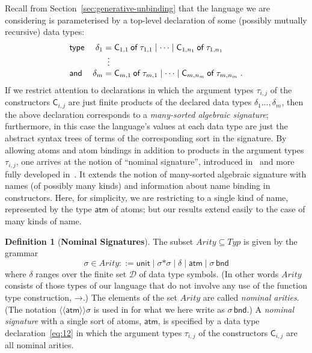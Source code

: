\documentclass{LMCS}
\theoremstyle{plain}
\theoremstyle{definition}
\newtheorem{definition}[thm]{Definition}
\newcommand{\ALT}{\mathrel{\kw{|}}}
\newcommand{\AND}{\kw{and}}
\newcommand{\ar}[1][\sigma]{#1}
\newcommand{\Arity}{\mathit{Arity}}
\newcommand{\ATM}{\kw{atm}}
\newcommand{\BINDTY}{\kw{bnd}}
\newcommand{\CON}[1][C]{\kw{#1}}
\newcommand{\dty}{\delta}
\newcommand{\Dty}{\mathcal{D}}
\newcommand{\EQ}{\mathbin{\kw{=}}}
\newcommand{\FUNTY}{\mathbin{\rightarrow}}
\newcommand{\kw}[1]{\mathsf{#1}}
\newcommand{\OF}{\mathbin{\kw{of}}}
\newcommand{\PRODTY}{\mathbin{\kw{*}}}
\newcommand{\ty}{\tau}
\newcommand{\Ty}{\mathit{Typ}}
\newcommand{\TYPE}{\kw{type}}
\newcommand{\UNIT}{\kw{unit}}
\begin{document}
Recall from Section~\ref{sec:generative-unbinding} that the language
we are considering is parameterised by a top-level declaration of some
(possibly mutually recursive) data types:
\begin{equation}
  \label{eq:12}
    \begin{array}{lr@{\;}c@{\;}l}
  \TYPE & \dty_1 & \EQ & 
  \CON_{1,1}\OF\ty_{1,1} \ALT \cdots \ALT \CON_{1,n_1}\OF\ty_{1,n_1}\\
  & & \vdots & \\
  \AND & \dty_m & \EQ & 
  \CON_{m,1}\OF\ty_{m,1} \ALT \cdots \ALT \CON_{m,n_m}\OF\ty_{m,n_m}\;.
  \end{array}
\end{equation}
If we restrict attention to declarations in which the argument types
$\ty_{i,j}$ of the constructors $\CON_{i,j}$ are just finite products
of the declared data types $\dty_1\ldots,\dty_m$, then the above
declaration corresponds to a \emph{many-sorted algebraic signature};
furthermore, in this case the language's values at each data type are
just the abstract syntax trees of terms of the corresponding sort in
the signature.  By allowing atoms and atom bindings in addition to
products in the argument types $\ty_{i,j}$, one arrives at the notion
of ``nominal signature'', introduced in~\cite{PittsAM:nomu-jv} and
more fully developed in~\cite{PittsAM:alpsri}. It extends the notion
of many-sorted algebraic signature with names (of possibly many kinds)
and information about name binding in constructors. Here, for
simplicity, we are restricting to a single kind of name, represented
by the type $\ATM$ of atoms; but our results extend easily to the case
of many kinds of name.

\begin{definition}[\textbf{Nominal Signatures}]
  \label{def:noms}
  The subset $\Arity\subseteq\Ty$ is given by the grammar
  \begin{equation}
    \label{eq:9}
    \ar\in\Arity 
    ::= \UNIT 
    \mid \ar\PRODTY\ar 
    \mid \dty 
    \mid \ATM 
    \mid \ar\,\BINDTY
  \end{equation}
  where $\dty$ ranges over the finite set $\Dty$ of data type symbols.
  (In other words $\Arity$ consists of those types of our language
  that do not involve any use of the function type construction,
  $\FUNTY$.)  The elements of the set $\Arity$ are called
  \emph{nominal arities}. (The notation
  $\langle\!\langle\ATM\rangle\!\rangle\ar$ is used in
  \cite{PittsAM:nomu-jv,PittsAM:alpsri} for what we here write as
  $\ar\,\BINDTY$.) A \emph{nominal signature} with a single sort of
  atoms, $\ATM$, is specified by a data type declaration~\eqref{eq:12}
  in which the argument types $\ty_{i,j}$ of the constructors
  $\CON_{i,j}$ are all nominal arities.
\end{definition}
\end{document}
